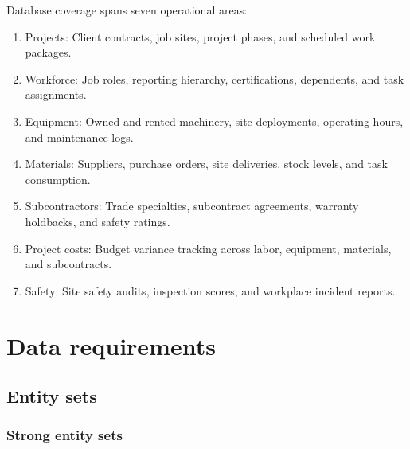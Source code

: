 \documentclass[a4paper,12pt]{report}
\providecommand{\tightlist}{%
  \setlength{\itemsep}{0pt}\setlength{\parskip}{0pt}}
\begin{document}
Database coverage spans seven operational areas:

\begin{enumerate}
\def\labelenumi{\arabic{enumi}.}
\tightlist
\item
  Projects: Client contracts, job sites, project phases, and scheduled work packages.
\item
  Workforce: Job roles, reporting hierarchy, certifications, dependents, and task assignments.
\item
  Equipment: Owned and rented machinery, site deployments, operating hours, and maintenance logs.
\item
  Materials: Suppliers, purchase orders, site deliveries, stock levels, and task consumption.
\item
  Subcontractors: Trade specialties, subcontract agreements, warranty holdbacks, and safety ratings.
\item
  Project costs: Budget variance tracking across labor, equipment, materials, and subcontracts.
\item
  Safety: Site safety audits, inspection scores, and workplace incident reports.
\end{enumerate}

\chapter{Data requirements}\label{data-requirements}

\section{Entity sets}\label{entity-sets}

\subsection{Strong entity sets}\label{strong-entity-sets}
\end{document}

